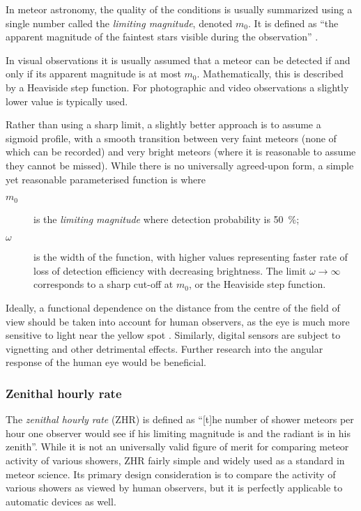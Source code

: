             In meteor astronomy, the quality of the conditions is usually summarized
            using a single number called the \emph{limiting magnitude}, denoted $m_0$.
            It is defined as ``the apparent magnitude of the faintest stars visible during the observation'' \citep{imo-glossary}.

            In visual observations it is usually assumed that a meteor can be detected if and only if
            its apparent magnitude is at most $m_0$. Mathematically, this is described by a Heaviside step function.
            For photographic and video observations a slightly lower value is typically used.

            Rather than using a sharp limit, a slightly better approach is to assume a sigmoid profile,
            with a smooth transition between very faint meteors (none of which can be recorded)
            and very bright meteors (where it is reasonable to assume they cannot be missed).
            While there is no universally agreed-upon form, a simple yet reasonable parameterised function is
            where
            \begin{description}
                \item[$m_0$]    is the \textit{limiting magnitude} where detection probability is \SI{50}{\percent};
                \item[$\omega$] is the width of the function, with higher values representing
                    faster rate of loss of detection efficiency with decreasing brightness.
                    The limit $\omega \to \infty$ corresponds to a sharp cut-off at $m_0$,
                    or the Heaviside step function.
            \end{description}

            Ideally, a functional dependence on the distance from the centre of the field
            of view should be taken into account for human observers, as the eye is much more
            sensitive to light near the yellow spot .
            Similarly, digital sensors are subject to vignetting and other detrimental effects.
            Further research into the angular response of the human eye would be beneficial.

        \subsubsection{Zenithal hourly rate} \label{mspz}
            The \emph{zenithal hourly rate} (ZHR) is defined as ``[t]he number of shower meteors per hour
            one observer would see if his limiting magnitude is  and the radiant is in his zenith''.
            While it is not an universally valid figure of merit for comparing meteor activity of various showers,
            ZHR fairly simple and widely used as a standard in meteor science.
            Its primary design consideration is to compare the activity of various showers as viewed by human observers,
            but it is perfectly applicable to automatic devices as well.

